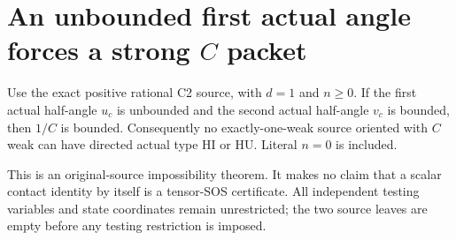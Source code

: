 \section{\texorpdfstring{An unbounded first actual angle forces a strong $C$ packet}{An unbounded first actual angle forces a strong C packet}}
\label{component:pb7189b9c1f6e}

\label{pb7189b9c1f6e:sec:c2-weak-hi-hu-empty}

\begin{theorem}
Use the exact positive rational C2 source, with $d=1$ and $n\geq0$.
If the first actual half-angle $u_c$ is unbounded and the second
actual half-angle $v_c$ is bounded, then $1/C$ is bounded.
Consequently no exactly-one-weak source oriented with $C$ weak can
have directed actual type HI or HU.  Literal $n=0$ is included.
\end{theorem}

This is an original-source impossibility theorem.  It makes no
claim that a scalar contact identity by itself is a tensor-SOS
certificate.  All independent testing variables and state coordinates
remain unrestricted; the two source leaves are empty before any
testing restriction is imposed.

